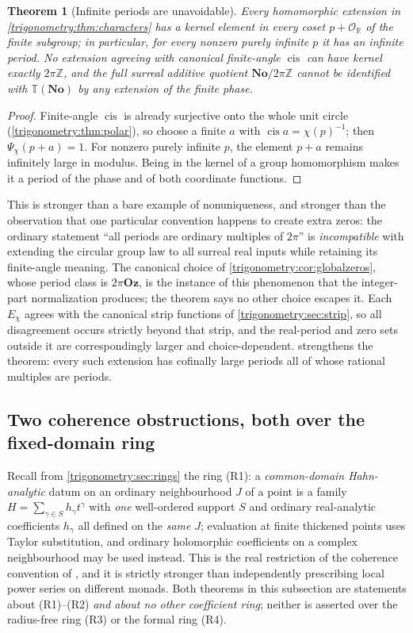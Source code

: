 \documentclass[11pt,letterpaper]{article}
\numberwithin{equation}{section}
\newtheorem{theorem}{Theorem}[section]
\theoremstyle{definition}
\theoremstyle{remark}
\newcommand{\No}{\mathbf{No}}
\newcommand{\Oz}{\mathbf{Oz}}
\newcommand{\R}{\mathbb R}
\newcommand{\Z}{\mathbb Z}
\newcommand{\OO}{\mathcal O}
\newcommand{\TT}{\mathbb T}
\newcommand{\cis}{\operatorname{cis}}
\begin{document}
\begin{theorem}[Infinite periods are unavoidable]\label{trigonometry:thm:infiniteperiods}
Every homomorphic extension in \cref{trigonometry:thm:characters} has a kernel element in every
coset $p+\OO_{\R}$ of the finite subgroup; in particular, for every nonzero purely infinite $p$ it
has an infinite period. \emph{No extension agreeing with canonical finite-angle $\cis$ can have
kernel exactly $2\pi\Z$}, and the full surreal additive quotient $\No/2\pi\Z$ cannot be identified
with $\TT(\No)$ by any extension of the finite phase.
\end{theorem}
\begin{proof}
Finite-angle $\cis$ is already surjective onto the whole unit circle
(\cref{trigonometry:thm:polar}), so choose a finite $a$ with $\cis a=\chi(p)^{-1}$; then
$\Psi_\chi(p+a)=1$. For nonzero purely infinite $p$, the element $p+a$ remains infinitely large in
modulus. Being in the kernel of a group homomorphism makes it a period of the phase and of both
coordinate functions.
\end{proof}
This is stronger than a bare example of nonuniqueness, and stronger than the observation that one
particular convention happens to create extra zeros: the ordinary statement ``all periods are
ordinary multiples of $2\pi$'' is \emph{incompatible} with extending the circular group law to all
surreal real inputs while retaining its finite-angle meaning. The canonical choice of
\cref{trigonometry:cor:globalzeros}, whose period class is $2\pi\Oz$, is the instance of this
phenomenon that the integer-part normalization produces; the theorem says no other choice escapes
it. Each $E_\chi$ agrees with the canonical strip functions of \cref{trigonometry:sec:strip}, so
all disagreement occurs strictly beyond that strip, and the real-period and zero sets outside it
are correspondingly larger and choice-dependent.  strengthens the
theorem: every such extension has cofinally large periods all of whose rational multiples are periods.

\subsection{Two coherence obstructions, both over the fixed-domain ring}
Recall from \cref{trigonometry:sec:rings} the ring (R1): a \emph{common-domain Hahn-analytic}
datum on an ordinary neighbourhood $J$ of a point is a family $H=\sum_{\gamma\in S}h_\gamma
t^\gamma$ with \emph{one} well-ordered support $S$ and ordinary real-analytic coefficients
$h_\gamma$ all defined on the \emph{same} $J$; evaluation at finite thickened points uses Taylor
substitution, and ordinary holomorphic coefficients on a complex neighbourhood may be used instead.
This is the real restriction of the coherence convention of \cite{SourceAnalysis}, and it is
strictly stronger than independently prescribing local power series on different monads. Both
theorems in this subsection are statements about (R1)--(R2) \emph{and about no other coefficient
ring}; neither is asserted over the radius-free ring (R3) or the formal ring (R4).
\end{document}

